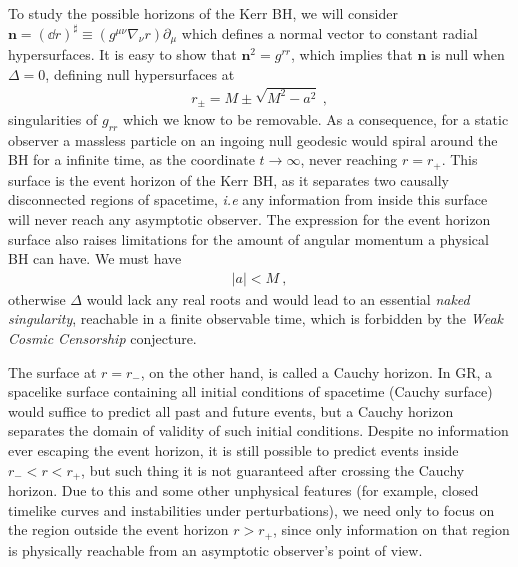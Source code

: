 To study the possible horizons of the Kerr BH, we will consider $\bm{n} = (\dd r)^\sharp \equiv (g^{\mu\nu} \nabla_\nu r) \partial_\mu$ which defines a normal vector to constant radial hypersurfaces.
It is easy to show that $\bm{n}^2 = g^{rr}$, which implies that $\bm{n}$ is null when $\Delta=0$, defining null hypersurfaces at 
\begin{align}
    r_\pm = M \pm \sqrt{M^2 - a^2} ~,
    \label{eq2:KerrRadius}
\end{align}
singularities of $g_{rr}$ which we know to be removable.
As a consequence, for a static observer a massless particle on an ingoing null geodesic would spiral around the BH for a infinite time, as the coordinate $t\to\infty$, never reaching $r=r_{+}$.
This surface is the event horizon of the Kerr BH, as it separates two causally disconnected regions of spacetime, \emph{i.e} any information from inside this surface will never reach any asymptotic observer. 
The expression for the event horizon surface also raises limitations for the amount of angular momentum a physical BH can have.
We must have 
\begin{align}
    |a| < M ~,
    \label{eq2:spinLimit}
\end{align}
otherwise $\Delta$ would lack any real roots and would lead to an essential \emph{naked singularity}, reachable in a finite observable time, which is forbidden by the \emph{Weak Cosmic Censorship} conjecture.  

The surface at $r=r_{-}$, on the other hand, is called a Cauchy horizon.
In GR, a spacelike surface containing all initial conditions of spacetime (Cauchy surface) would suffice to predict all past and future events, but a Cauchy horizon separates the domain of validity of such initial conditions.
Despite no information ever escaping the event horizon, it is still possible to predict events inside $r_{-} < r < r_{+}$, but such thing it is not guaranteed after crossing the Cauchy horizon.
Due to this and some other unphysical features (for example, closed timelike curves and instabilities under perturbations), we need only to focus on the region outside the event horizon $r>r_{+}$, since only information on that region is physically reachable from an asymptotic observer's point of view.

